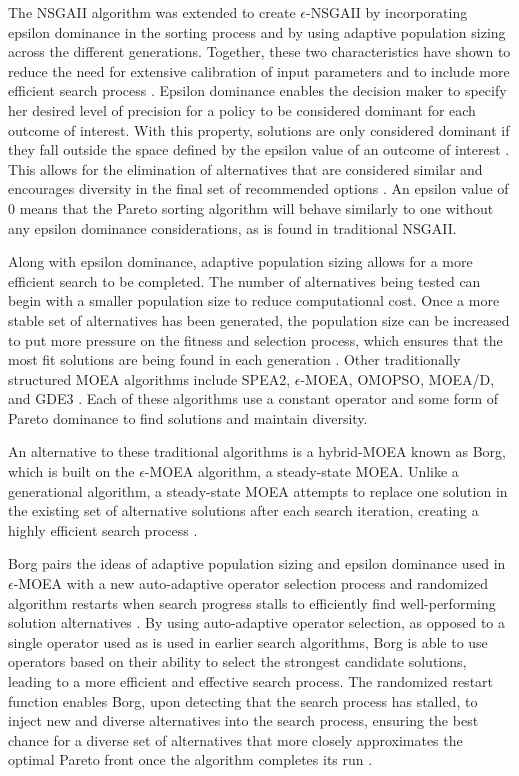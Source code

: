 The NSGAII algorithm was extended to create $\epsilon$-NSGAII by incorporating epsilon dominance in the sorting process and by using adaptive population sizing across the different generations. Together, these two characteristics have shown to reduce the need for extensive calibration of input parameters and to include more efficient search process \citep{Ward2015}. Epsilon dominance enables the decision maker to specify her desired level of precision for a policy to be considered dominant for each outcome of interest. With this property, solutions are only considered dominant if they fall outside the space defined by the epsilon value of an outcome of interest \citep{Horoba2008}. This allows for the elimination of alternatives that are considered similar and encourages diversity in the final set of recommended options \citep{Reed2013}. An epsilon value of 0 means that the Pareto sorting algorithm will behave similarly to one without any epsilon dominance considerations, as is found in traditional NSGAII. 

Along with epsilon dominance, adaptive population sizing allows for a more efficient search to be completed. The number of alternatives being tested can begin with a smaller population size to reduce computational cost. Once a more stable set of alternatives has been generated, the population size can be increased to put more pressure on the fitness and selection process, which ensures that the most fit solutions are being found in each generation \citep{Ward2015}. Other traditionally structured MOEA algorithms include SPEA2, $\epsilon$-MOEA, OMOPSO, MOEA/D, and GDE3 \citep{Reed2013, Ward2015, Zheng2016}. Each of these algorithms use a constant operator and some form of Pareto dominance to find solutions and maintain diversity.

An alternative to these traditional algorithms is a hybrid-MOEA known as Borg, which is built on the $\epsilon$-MOEA algorithm, a steady-state MOEA. Unlike a generational algorithm, a steady-state MOEA attempts to replace one solution in the existing set of alternative solutions after each search iteration, creating a highly efficient search process \citep{Ward2015}. 

Borg pairs the ideas of adaptive population sizing and epsilon dominance used in $\epsilon$-MOEA with a new auto-adaptive operator selection process and randomized algorithm restarts when search progress stalls to efficiently find well-performing solution alternatives \citep{HadkaReed2013}. By using auto-adaptive operator selection, as opposed to a single operator used as is used in earlier search algorithms, Borg is able to use operators based on their ability to select the strongest candidate solutions, leading to a more efficient and effective search process. The randomized restart function enables Borg, upon detecting that the search process has stalled, to inject new and diverse alternatives into the search process, ensuring the best chance for a diverse set of alternatives that more closely approximates the optimal Pareto front once the algorithm completes its run \citep{Reed2013}. 


